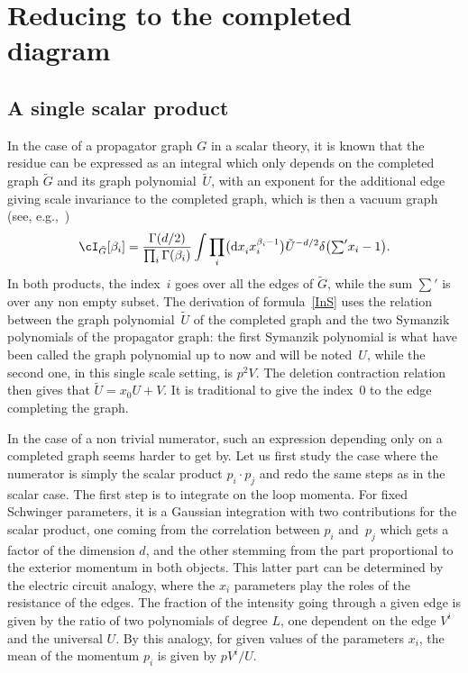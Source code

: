 \section{Reducing to the completed diagram}
\subsection{A single scalar product}

In the case of a propagator graph $G$ in a scalar theory, it is known that the residue can be expressed as an integral which
only depends on the completed graph $\tilde G$ and its graph polynomial~$\tilde U$, with an exponent
for the additional edge giving scale invariance to the completed graph, which is then a vacuum graph (see, e.g.,~\cite{Sch10})
\begin{equation} \label{InS}
	\cI_{\tilde G} [\beta_i] = \frac {\Gamma(d/2)} {\prod_i \Gamma(\beta_i)}
			\int \prod_i \bigl( {\rm d}x_i^{\vphantom {\beta_i}} x_i^{\beta_i-1}\bigr)
			\tilde U^{-d/2} \delta \bigl(\textstyle{ \sum' }x_i -1\bigr).
\end{equation}
In both products, the index~$i$ goes over all the edges of $\tilde G$, while the sum $\sum'$ is over any non
empty subset.
The derivation of formula~\eqref{InS} uses the relation between the graph polynomial~$\tilde U$ of the completed
graph and the two Symanzik polynomials of the propagator graph: the first Symanzik polynomial is what have been called the graph
polynomial up to now and will be noted~$U$, while the second one, in this single scale setting, is $p^2 V$. The
deletion contraction relation then gives that $\tilde U = x_0 U + V$. It is traditional to give the
index~0 to the edge completing the graph.

In the case of a non trivial numerator, such an expression depending only on a completed graph seems harder to get by. Let us first study the case where the numerator is simply the scalar product $p_i\cdot p_j$ and redo the same steps as in the scalar case.
The first step is to integrate on the loop momenta. For fixed Schwinger parameters, it is a Gaussian integration with two
contributions for the scalar product, one coming from the correlation between $p_i$ and~$p_j$ which gets a factor of the dimension $d$, and the other stemming from the part proportional to the exterior momentum in both objects.
This latter part can be determined by the electric circuit analogy, where the $x_i$ parameters play the roles of
the resistance of the edges. The fraction of the intensity going through a given edge is given by the ratio of two
polynomials of degree $L$, one dependent on the edge $V^i$ and the universal $U$. By this analogy, for given
values of the parameters $x_i$, the mean of the momentum $p_i$ is given by $ p V^i/U$.

